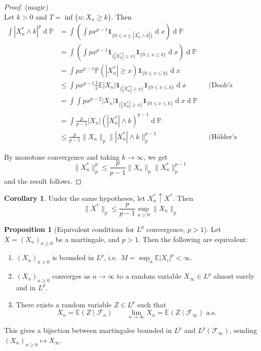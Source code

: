 \documentclass[parskip=full]{article}
\theoremstyle{definition}
\newtheorem{corollary}{Corollary}
\newtheorem{proposition}{Proposition}[section]
\renewcommand{\d}[1]{\ensuremath{\operatorname{d}\!{#1}}}
\newcommand{\Pbb}{\mathbb{P}}
\newcommand{\1}{\mathbbm{1}}
\newcommand{\E}{\mathbb{E}}
\begin{document}
\begin{proof} (magic) \\
  Let $k > 0$ and $T = \inf\{n: X_n \geq k\}$. Then
  \begin{align*}
    \int |X_n^* \wedge k|^p \d \Pbb &= \int \left( 
      \int p x^{p - 1} \mathbf{1}_{\{0 \leq x \leq |X_n^* \wedge k|\}} \d x \right) \d \Pbb \\
      &= \int \left( 
        \int p x^{p - 1} \mathbf{1}_{\{|X_n^*| \geq x\}} \mathbf{1}_{\{0 \leq x \leq k\}} \d x \right) \d \Pbb \\
      & = \int p x^{p - 1} \Pbb(|X_n^*|\geq x) \mathbf{1}_{\{0 \leq x \leq k\}}\d x\\
      & \leq \int p x^{p - 1} \frac{1}{x} \E |X_n| \mathbf{1}_{\{|X_n^*| \geq x\}} \mathbf{1}_{\{0 \leq x \leq k\}} \d x &   & \text{(Doob's maximal inequality)} \\
      & = \int \int p x^{p - 2} |X_n| \mathbf{1}_{\{|X_n^*| \geq x\}} \mathbf{1}_{\{0 \leq x \leq k\}}\d x \d \Pbb \\
      & = \int \frac{p}{p - 1}  |X_n| (|X_n^*| \wedge k)^{p - 1} \d \Pbb \\
      & \leq \frac{p}{p - 1} \|X_n\|_p \| |X_n^*| \wedge k\|_p^{p - 1} &   & \text{(H\"older's inequality)} 
  \end{align*}

  By monotone convergence and taking $k \to \infty$, we get
  \[
    \|X_n^*\|_p^p \leq \frac{p}{p - 1} \|X_n\|_p \|X_n^*\|_p^{p - 1}
  \]
  and the result follows.
\end{proof}

\begin{corollary} \label{Doob Lp limit}
  Under the same hypotheses, let $X^*_n \uparrow X^*$. Then
  \[
    \|X^*\|_p \leq \frac{p}{p - 1} \sup_{n \geq 0} \|X_n\|_p
  \]
\end{corollary}

\begin{proposition}[Equivalent conditions for $L^p$ convergence, $p > 1$]
  Let $X = (X_n)_{n \geq 0}$ be a martingale, and $p > 1$. Then the following are equivalent:
  \begin{enumerate}
    \item $(X_n)_{n \geq 0}$ is bounded in $L^p$, i.e.\ $M = \sup_n \E |X_i|^p < \infty$.
    \item $(X_n)_{n \geq 0}$ converges as $n \to \infty$ to a random variable $X_\infty \in L^p$ almost surely and in $L^p$.
    \item There exists a random variable $Z \in L^p$ such that
      \[
        X_n = \E (Z \mid \mathcal{F}_n) \qquad \lim_{n \to \infty} X_n = \E (Z \mid \mathcal{F}_\infty) \text{ a.s.}
      \]
  \end{enumerate}
  This gives a bijection between martingales bounded in $L^p$ and $L^p(\mathcal{F}_\infty)$, sending $(X_n)_{n \geq 0} \mapsto X_\infty$.
\end{proposition}
\end{document}
